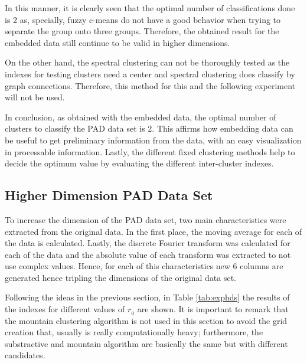 \documentclass[conference]{IEEEtran}
\theoremstyle{definition}
\theoremstyle{remark}
\theoremstyle{remark}
\begin{document}
In this manner, it is clearly seen that the optimal number of classifications
done is 2 as, specially, fuzzy c-means do not have a good behavior when trying
to separate the group onto three groups. Therefore, the obtained result for the
embedded data still continue to be valid in higher dimensions.

On the other hand, the spectral clustering can not be thoroughly tested as the
indexes for testing clusters need a center and spectral clustering does classify
by graph connections. Therefore, this method for this and the following
experiment will not be used.

In conclusion, as obtained with the embedded data, the optimal number of
clusters to classify the PAD data set is 2. This affirms how embedding data can
be useful to get preliminary information from the data, with an easy
visualization in processable information. Lastly, the different fixed clustering
methods help to decide the optimum value by evaluating the different
inter-cluster indexes.

\subsection{Higher Dimension PAD Data Set}

To increase the dimension of the PAD data set, two main characteristics were
extracted from the original data. In the first place, the moving average for
each of the data is calculated. Lastly, the discrete Fourier transform was
calculated for each of the data and the absolute value of each transform was
extracted to not use complex values. Hence, for each of this characteristics new
6 columns are generated hence tripling the dimensions of the original data set.

Following the ideas in the previous section, in Table \ref{tab:exphds} the
results of the indexes for different values of $r_{a}$ are shown. It is
important to remark that the mountain clustering algorithm is not used in this
section to avoid the grid creation that, usually is really computationally
heavy; furthermore, the substractive and mountain algorithm are basically the
same but with different candidates.
\end{document}
